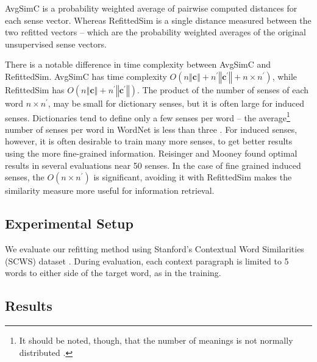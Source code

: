 \documentclass{llncs}
\def\parencite{\cite}
\renewcommand{\c}{\mathbf{c}}
\begin{document}
AvgSimC is a probability weighted average of pairwise computed distances for each sense vector.
Whereas RefittedSim is a single distance measured between the two refitted vectors -- which are the probability weighted averages of the original unsupervised sense vectors.


There is a notable difference in time complexity between AvgSimC and RefittedSim.
AvgSimC has time complexity $O(n\left\Vert \c\right\Vert +n^{\prime}\left\Vert \c^{\prime}\right\Vert +n\times n^{\prime})$,
while RefittedSim has $O(n\left\Vert \c\right\Vert +n^{\prime}\left\Vert \c^{\prime}\right\Vert)$.
The product of the number of senses of each word $n \times n^\prime$, may be small for dictionary senses, but it is often large for induced senses. Dictionaries tend to define only a few senses per word -- the average\footnote{It should be noted, though, that the number of meanings is not normally distributed \parencite{zipf1945meaning}.} number of senses per word in WordNet is less than three \parencite{miller1995wordnet}.
For induced senses, however, it is often desirable to train many more senses, to get better results using the more fine-grained information.
Reisinger and Mooney \parencite{Reisinger2010} found optimal results in several evaluations near 50 senses.
In the case of fine grained induced senses, the $O(n \times n^\prime)$ is significant, avoiding it with RefittedSim makes the similarity measure more useful for information retrieval.

\subsection{Experimental Setup}
We evaluate our refitting method using Stanford's Contextual Word Similarities (SCWS) dataset \parencite{Huang2012}.
During evaluation, each context paragraph is limited to 5 words to either side of the target word, as in the training.


\subsection{Results}
\end{document}

